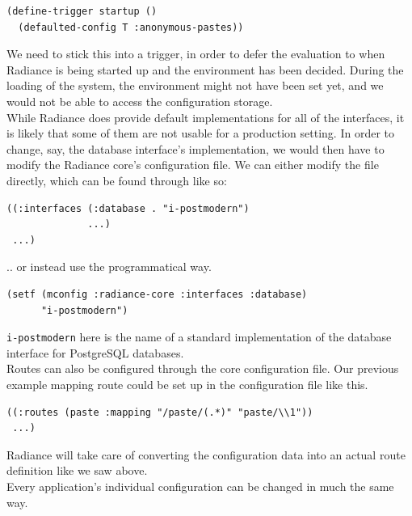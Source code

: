 \documentclass{sig-alternate}
\begin{document}
\begin{verbatim}
(define-trigger startup ()
  (defaulted-config T :anonymous-pastes))
\end{verbatim}

We need to stick this into a trigger, in order to defer the evaluation to when Radiance is being started up and the environment has been decided. During the loading of the system, the environment might not have been set yet, and we would not be able to access the configuration storage. \\

While Radiance does provide default implementations for all of the interfaces, it is likely that some of them are not usable for a production setting. In order to change, say, the database interface's implementation, we would then have to modify the Radiance core's configuration file. We can either modify the file directly, which can be found through  like so:

\begin{verbatim}
((:interfaces (:database . "i-postmodern")
              ...)
 ...)
\end{verbatim}

.. or instead use the programmatical way.

\begin{verbatim}
(setf (mconfig :radiance-core :interfaces :database)
      "i-postmodern")
\end{verbatim}

\texttt{i-postmodern} here is the name of a standard implementation of the database interface for PostgreSQL databases. \\

Routes can also be configured through the core configuration file. Our previous example mapping route could be set up in the configuration file like this.

\begin{verbatim}
((:routes (paste :mapping "/paste/(.*)" "paste/\\1"))
 ...)
\end{verbatim}

Radiance will take care of converting the configuration data into an actual route definition like we saw above. \\

Every application's individual configuration can be changed in much the same way.
\end{document}
